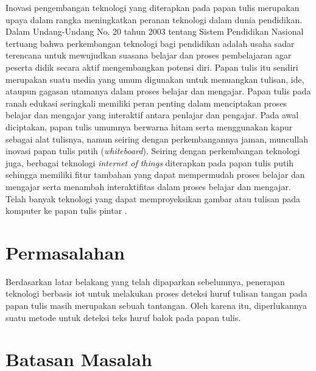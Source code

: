 Inovasi pengembangan teknologi yang diterapkan pada papan tulis merupakan upaya dalam rangka meningkatkan peranan teknologi dalam dunia pendidikan. Dalam Undang-Undang No. 20 tahun 2003 tentang Sistem Pendidikan Nasional tertuang bahwa perkembangan teknologi bagi pendidikan adalah usaha sadar terencana untuk mewujudkan suasana belajar dan proses pembelajaran agar peserta didik secara aktif mengembangkan potensi diri. Papan tulis itu sendiri merupakan suatu media yang umum digunakan untuk menuangkan tulisan, ide, ataupun gagasan utamanya dalam proses belajar dan mengajar. Papan tulis pada ranah edukasi seringkali memiliki peran penting dalam menciptakan proses belajar dan mengajar yang interaktif antara penlajar dan pengajar. Pada awal diciptakan, papan tulis umumnya berwarna hitam serta menggunakan kapur sebagai alat tulisnya, namun seiring dengan perkembangannya jaman,  muncullah inovasi papan tulis putih (\textit{whiteboard}). Seiring dengan perkembangan teknologi juga, berbagai teknologi \textit{internet of things} diterapkan pada papan tulis putih sehingga memiliki fitur tambahan yang dapat mempermudah proses belajar dan mengajar serta menambah interaktifitas dalam proses belajar dan mengajar. Telah banyak teknologi yang dapat memproyeksikan gambar atau tulisan pada komputer ke papan tulis pintar \citep*{kellerman2018smart}. \par

\section{Permasalahan}
\label{sec:permasalahan}
Berdasarkan latar belakang yang telah dipaparkan sebelumnya, penerapan teknologi berbasis iot untuk melakukan proses deteksi huruf tulisan tangan pada papan tulis masih merupakan sebuah tantangan. Oleh karena itu, diperlukannya suatu metode untuk deteksi teks huruf balok pada papan tulis.

\section{Batasan Masalah}
\label{sec:batasanmasalah}

